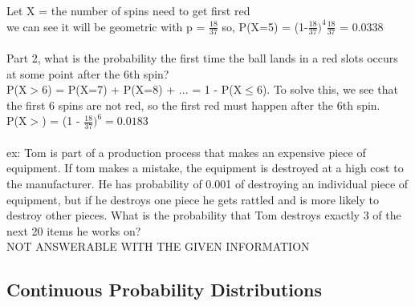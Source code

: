 \documentclass[12pt, a4paper]{article}
\begin{document}
	Let X = the number of spins need to get first red \\ we can see it will be geometric with p = $\frac{18}{37}$ so,
	P(X=5) = (1-$\frac{18}{37})^4\frac{18}{37}$ = 0.0338 \\~\\
	Part 2, what is the probability the first time the ball lands in a red slots occurs at some point after the 6th spin? \\
	P(X$>$6) = P(X=7) + P(X=8) + ... = 1 - P(X$\leq$6). To solve this, we see that the first 6 spins are not red, so the first red must happen after the 6th spin. \\ P(X$>$) = (1 - $\frac{18}{37})^6 = 0.0183$ \\~\\
	ex: Tom is part of a production process that makes an expensive piece of equipment. If tom makes a mistake, the equipment is destroyed at a high cost to the manufacturer. He has probability of 0.001 of destroying an individual piece of equipment, but if he destroys one piece he gets rattled and is more likely to destroy other pieces. What is the probability that Tom destroys exactly 3 of the next 20 items he works on? \\
	NOT ANSWERABLE WITH THE GIVEN INFORMATION \newpage
	


\begin{center} \section{Continuous Probability Distributions} \end{center}
\end{document}
